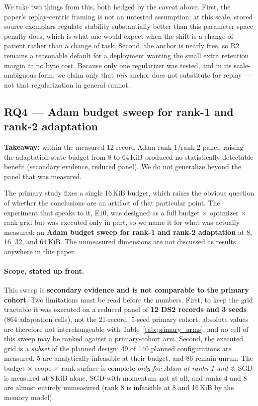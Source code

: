 We take two things from this, both hedged by the caveat above. First, the paper's
replay-centric framing is not an untested assumption: at this scale, stored source
exemplars regulate stability substantially better than this parameter-space
penalty does, which is what one would expect when the shift is a change of patient
rather than a change of task. Second, the anchor is nearly free, so R2 remains a
reasonable default for a deployment wanting the small extra retention margin at no
byte cost. Because only one regularizer was tested, and in its scale-ambiguous
form, we claim only that \emph{this} anchor does not substitute for replay --- not
that regularization in general cannot.



\subsection{RQ4 --- Adam budget sweep for rank-1 and rank-2 adaptation}
\label{sec:rq4}

\textbf{Takeaway:} within the measured 12-record Adam rank-1/rank-2 panel,
raising the adaptation-state budget from 8 to 64\,KiB produced no statistically
detectable benefit (secondary evidence, reduced panel). We do not generalize
beyond the panel that was measured.

The primary study fixes a single 16\,KiB budget, which raises the obvious
question of whether the conclusions are an artifact of that particular point. The
experiment that speaks to it, E10, was designed as a full budget $\times$
optimizer $\times$ rank grid but was executed only in part, so we name it for
what was actually measured: an \textbf{Adam budget sweep for rank-1 and rank-2
adaptation} at 8, 16, 32, and 64\,KiB. The unmeasured dimensions are not
discussed as results anywhere in this paper.

\paragraph{Scope, stated up front.} This sweep is \textbf{secondary evidence and
is not comparable to the primary cohort}. Two limitations must be read before the
numbers. First, to keep the grid tractable it was executed on a reduced panel of
\textbf{12 DS2 records and 3 seeds} (864 adaptation cells), not the 21-record,
5-seed primary cohort; absolute values are therefore not interchangeable with
Table~\ref{tab:primary_arms}, and no cell of this sweep may be ranked against a
primary-cohort arm. Second, the executed grid is a \emph{subset} of the planned
design: 49 of 140 planned configurations are measured, 5 are analytically
infeasible at their budget, and 86 remain unrun. The budget $\times$ scope
$\times$ rank surface is complete \emph{only for Adam at ranks 1 and 2}; SGD is
measured at 8\,KiB alone, SGD-with-momentum not at all, and ranks 4 and 8 are
almost entirely unmeasured (rank 8 is infeasible at 8 and 16\,KiB by the memory
model).

